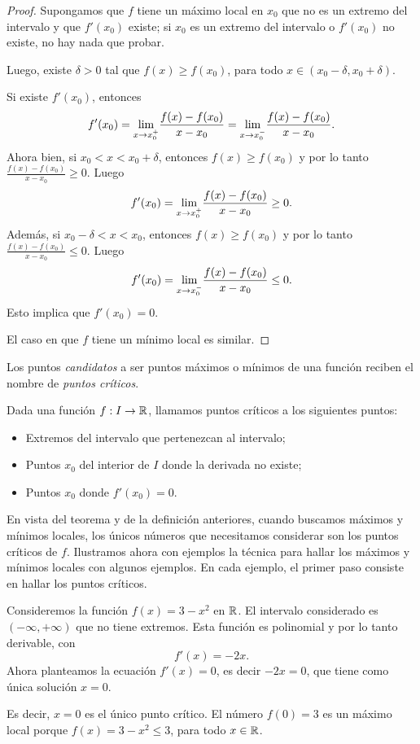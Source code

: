 \begin{proof}
    Supongamos que $f$ tiene un máximo local en $x_0$ que no es un extremo del intervalo y que $f'(x_0)$ existe; si $x_0$ es un extremo del intervalo o $f'(x_0)$ no existe, no hay nada que probar.

    Luego, existe $\delta > 0$ tal que $f(x)\ge f(x_0)$, para todo $x\in(x_0-\delta,x_0+\delta)$.

    Si existe $f'(x_0)$, entonces
    \[
    f'(x_0)= {\lim_{x\to x_0^+}} \frac{f(x)-f(x_0)}{x-x_0} = {\lim_{x\to x_0^-}} \frac{f(x)-f(x_0)}{x-x_0}.
    \]
    Ahora bien, si $x_0<x<x_0+\delta$, entonces $f(x)\ge f(x_0)$ y por lo tanto $\frac{f(x)-f(x_0)}{x-x_0}\ge 0$. Luego
    \[
    f'(x_0) = {\lim_{x\to x_0^+}} \frac{f(x)-f(x_0)}{x-x_0} \ge 0.
    \]
    Además, si $x_0-\delta <x<x_0$, entonces $f(x)\ge f(x_0)$ y por lo tanto $\frac{f(x)-f(x_0)}{x-x_0}\le 0$. Luego
    \[
    f'(x_0) = {\lim_{x\to x_0^-}} \frac{f(x)-f(x_0)}{x-x_0} \le 0.
    \]
    Esto implica que $f'(x_0)=0$.

    El caso en que $f$ tiene un mínimo local es similar.
\end{proof}

Los puntos \emph{candidatos} a ser puntos máximos o mínimos de una función reciben el nombre de \emph{puntos críticos}.
\begin{definition}
    Dada una función $f:I\to \mathbb{R}$, llamamos puntos críticos a los siguientes puntos:
    \begin{itemize}
        \item Extremos del intervalo que pertenezcan al intervalo;
        \item Puntos $x_0$ del interior de $I$ donde la derivada no existe;
        \item Puntos $x_0$ donde $f'(x_0)=0$.
    \end{itemize}
\end{definition}

En vista del teorema y de la definición anteriores, cuando buscamos máximos y mínimos locales, los únicos números que necesitamos considerar son los puntos críticos de $f$.
Ilustramos ahora con ejemplos la técnica para hallar los máximos y mínimos locales con algunos ejemplos. En cada ejemplo, el primer paso consiste en hallar los puntos críticos.

\begin{example}
    Consideremos la función $f(x)=3-x^2$ en $\mathbb{R}$. 
    El intervalo considerado es $(-\infty,+\infty)$ que no tiene extremos.
    Esta función es polinomial y por lo tanto derivable, con 
    \[f'(x)=-2x.\]
    Ahora planteamos la ecuación $f'(x)=0$, es decir $-2x=0$, que tiene como única solución $x=0$.

    Es decir, $x=0$ es el único punto crítico. El número $f(0)=3$ es un máximo local porque $f(x)=3-x^2\le 3$, para todo $x\in\mathbb{R}$.
\end{example}

